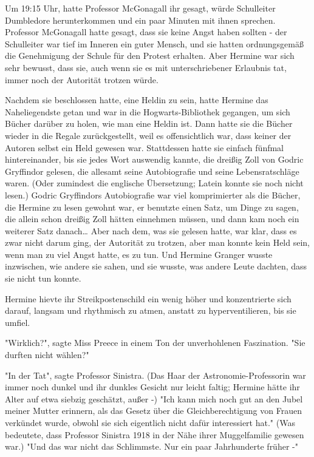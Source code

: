 {Um 19:15 Uhr, hatte Professor McGonagall ihr gesagt, würde Schulleiter Dumbledore herunterkommen und ein paar Minuten mit ihnen sprechen. Professor McGonagall hatte gesagt, dass sie keine Angst haben sollten - der Schulleiter war tief im Inneren ein guter Mensch, und sie hatten ordnungsgemäß die Genehmigung der Schule für den Protest erhalten. Aber Hermine war sich sehr bewusst, dass sie, auch wenn sie es mit unterschriebener Erlaubnis tat, immer noch der Autorität trotzen würde.

Nachdem sie beschlossen hatte, eine Heldin zu sein, hatte Hermine das Naheliegendste getan und war in die Hogwarts-Bibliothek gegangen, um sich Bücher darüber zu holen, wie man eine Heldin ist. Dann hatte sie die Bücher wieder in die Regale zurückgestellt, weil es offensichtlich war, dass keiner der Autoren selbst ein Held gewesen war. Stattdessen hatte sie einfach fünfmal hintereinander, bis sie jedes Wort auswendig kannte, die dreißig Zoll von Godric Gryffindor gelesen, die allesamt seine Autobiografie und seine Lebensratschläge waren. (Oder zumindest die englische Übersetzung; Latein konnte sie noch nicht lesen.) Godric Gryffindors Autobiografie war viel komprimierter als die Bücher, die Hermine zu lesen gewohnt war, er benutzte einen Satz, um Dinge zu sagen, die allein schon dreißig Zoll hätten einnehmen müssen, und dann kam noch ein weiterer Satz danach… Aber nach dem, was sie gelesen hatte, war klar, dass es zwar nicht darum ging, der Autorität zu trotzen, aber man konnte kein Held sein, wenn man zu viel Angst hatte, es zu tun. Und Hermine Granger wusste inzwischen, wie andere sie sahen, und sie wusste, was andere Leute dachten, dass sie nicht tun konnte.

Hermine hievte ihr Streikpostenschild ein wenig höher und konzentrierte sich darauf, langsam und rhythmisch zu atmen, anstatt zu hyperventilieren, bis sie umfiel.

"Wirklich?", sagte Miss Preece in einem Ton der unverhohlenen Faszination. "Sie durften nicht wählen?"

"In der Tat", sagte Professor Sinistra. (Das Haar der Astronomie-Professorin war immer noch dunkel und ihr dunkles Gesicht nur leicht faltig; Hermine hätte ihr Alter auf etwa siebzig geschätzt, außer -) "Ich kann mich noch gut an den Jubel meiner Mutter erinnern, als das Gesetz über die Gleichberechtigung von Frauen verkündet wurde, obwohl sie sich eigentlich nicht dafür interessiert hat." (Was bedeutete, dass Professor Sinistra 1918 in der Nähe ihrer Muggelfamilie gewesen war.) "Und das war nicht das Schlimmste. Nur ein paar Jahrhunderte früher -"

}
